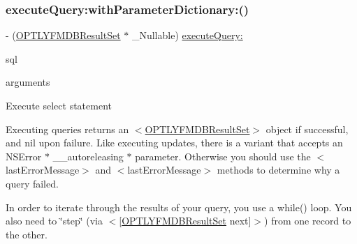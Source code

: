 \subsubsection{\texorpdfstring{execute\+Query\+:with\+Parameter\+Dictionary\+:()}{executeQuery:withParameterDictionary:()}}
{\footnotesize\ttfamily -\/ (\mbox{\hyperlink{interface_o_p_t_l_y_f_m_d_b_result_set}{O\+P\+T\+L\+Y\+F\+M\+D\+B\+Result\+Set}} $\ast$ \+\_\+\+Nullable) \mbox{\hyperlink{interface_o_p_t_l_y_f_m_d_b_database_ad749b1bd0f19dc48b36867d1622d201a}{execute\+Query\+:}} \begin{DoxyParamCaption}\item[{(N\+S\+String $\ast$)}]{sql }\item[{withParameterDictionary:(N\+S\+Dictionary $\ast$\+\_\+\+Nullable)}]{arguments }\end{DoxyParamCaption}}

Execute select statement

Executing queries returns an {\ttfamily $<$\mbox{\hyperlink{interface_o_p_t_l_y_f_m_d_b_result_set}{O\+P\+T\+L\+Y\+F\+M\+D\+B\+Result\+Set}}$>$} object if successful, and {\ttfamily nil} upon failure. Like executing updates, there is a variant that accepts an {\ttfamily N\+S\+Error $\ast$ \+\_\+\+\_\+autoreleasing $\ast$} parameter. Otherwise you should use the {\ttfamily $<$last\+Error\+Message$>$} and {\ttfamily $<$last\+Error\+Message$>$} methods to determine why a query failed.

In order to iterate through the results of your query, you use a {\ttfamily while()} loop. You also need to \char`\"{}step\char`\"{} (via {\ttfamily $<$\mbox{[}\mbox{\hyperlink{interface_o_p_t_l_y_f_m_d_b_result_set}{O\+P\+T\+L\+Y\+F\+M\+D\+B\+Result\+Set}} next\mbox{]}$>$}) from one record to the other.


